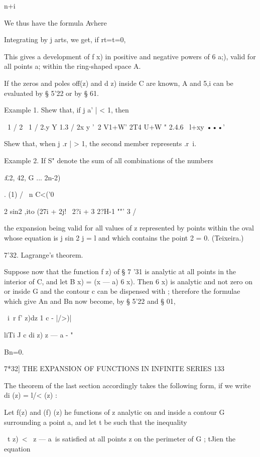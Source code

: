 n+i



We thus have the formula Avhere

Integrating by j arts, we get, if rt=t=0,

This gives a development of f x) in positive and negative powers of 6
a;), valid for all points a; within the ring-shaped space A.

If the zeros and poles off(z) and d z) inside C are known, A and 5,i
can be evaluated by § 5'22 or by § 61.

Example 1. Shew that, if j a' | < 1, then

\ 1 / 2 \ 1 / 2.y Y 1.3 / 2x y '~2 V1+W' 2T4 U+W " 2.4.6 \ l+xy •••'

Shew that, when j .r | > 1, the second member represents .r~i.

Example 2. If S" denote the sum of all combinations of the numbers

£2, 42, G ... 2n-2)%

. (1) / \ n C<('0



2 sin2 ,ito (27i + 2j! \ 2?i + 3 2?H-1 ""' 3 /



the expansion being valid for all values of z represented by points
within the oval whose equation is j sin 2 j = l and which contains the
point 2 = 0. (Teixeira.)

7'32. Lagrange's theorem.

Suppose now that the function f z) of § 7 '31 is analytic at all
points in the interior of C, and let B x) = (x — a) 6 x). Then 6 x) is
analytic and not zero on or inside G and the contour c can be
dispensed with ; therefore the formulae which give An and Bn now
become, by § 5'22 and § 01,

\ i\ r f' z)dz 1 c - |/>)|

liTi J c di z) z — a - "

Bn=0.



7*32] THE EXPANSION OF FUNCTIONS IN INFINITE SERIES 133

The theorem of the last section accordingly takes the following form,
if we write di (z) = l/< (z) :

Let f(z) and (f) (z) he functions of z analytic on and inside a
contour G surrounding a point a, and let t be such that the inequality

\ t z)\ < \ z — a\ is satisfied at all points z on the perimeter of G
; tJien the equation

